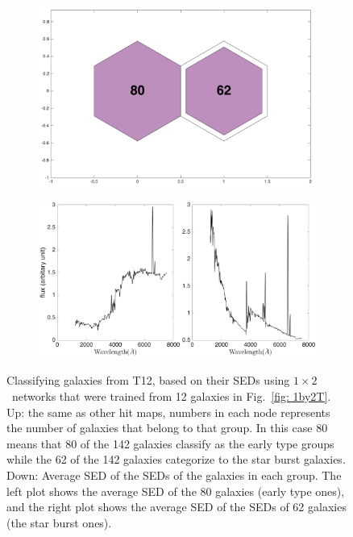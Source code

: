             \begin{figure}
                \begin{subfigure}[b]{0.5\textwidth}
                    \centering
                    \includegraphics[width=\textwidth]{../images0.01/1d/hit_v_1_by_2.png}
                \end{subfigure}
                \hfill
                \begin{subfigure}[b]{0.5\textwidth}
                     \includegraphics[width=\textwidth]{../images0.01/1d/SED_total1by2.png}
                \end{subfigure}
                \caption{Classifying galaxies from T12, based on their SEDs using $1\times2$~networks that were trained from 12 galaxies in Fig.~\ref{fig: 1by2T}. Up: the same as other hit maps, numbers in each node represents the number of galaxies that belong to that group. In this case 80 means that 80 of the 142 galaxies classify as the early type groups while the 62 of the 142 galaxies categorize to the star burst galaxies. Down: Average SED of the SEDs of the galaxies in each group. The left plot shows the average SED of the 80 galaxies (early type ones), and the right plot shows the average SED of the SEDs of 62 galaxies (the star burst ones).}
                \label{fig: 1by2V}
            \end{figure}            
